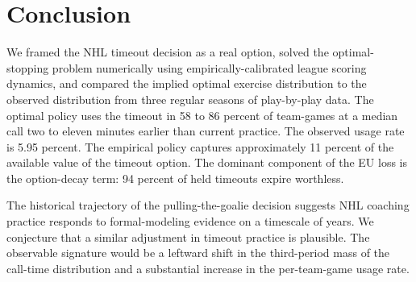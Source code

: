 \documentclass[11pt]{article}
\begin{document}
\section{Conclusion}

We framed the NHL timeout decision as a real option, solved the optimal-stopping problem numerically using empirically-calibrated league scoring dynamics, and compared the implied optimal exercise distribution to the observed distribution from three regular seasons of play-by-play data. The optimal policy uses the timeout in 58 to 86 percent of team-games at a median call two to eleven minutes earlier than current practice. The observed usage rate is 5.95 percent. The empirical policy captures approximately 11 percent of the available value of the timeout option. The dominant component of the EU loss is the option-decay term: 94 percent of held timeouts expire worthless.

The historical trajectory of the pulling-the-goalie decision suggests NHL coaching practice responds to formal-modeling evidence on a timescale of years. We conjecture that a similar adjustment in timeout practice is plausible. The observable signature would be a leftward shift in the third-period mass of the call-time distribution and a substantial increase in the per-team-game usage rate.



\end{document}
